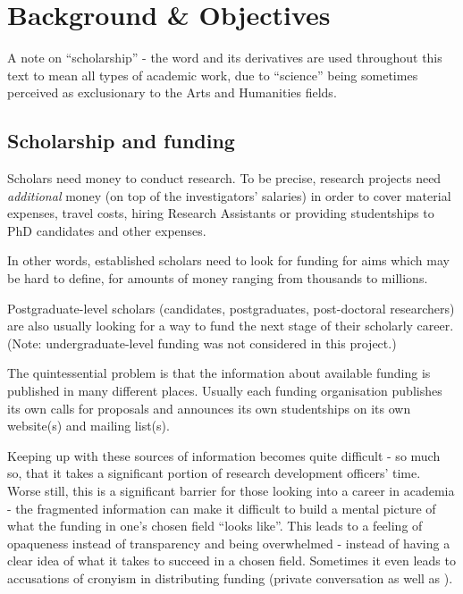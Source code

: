 \chapter{Background \& Objectives}



A note on ``scholarship'' - the word and its derivatives are used throughout this text to mean all types of academic work, due to ``science'' being sometimes perceived as exclusionary to the Arts and Humanities fields.

\section{Scholarship and funding}
Scholars need money to conduct research. To be precise, research projects need \emph{additional} money (on top of the investigators' salaries) in order to cover material expenses, travel costs, hiring Research Assistants or providing studentships to PhD candidates and other expenses. 

In other words, established scholars need to look for funding for aims which may be hard to define, for amounts of money ranging from thousands to millions.

Postgraduate-level scholars (candidates, postgraduates, post-doctoral researchers) are also usually looking for a way to fund the next stage of their scholarly career. (Note: undergraduate-level funding was not considered in this project.)

The quintessential problem is that the information about available funding is published in many different places. Usually each funding organisation publishes its own calls for proposals and announces its own studentships on its own website(s) and mailing list(s).

Keeping up with these sources of information becomes quite difficult - so much so, that it takes a significant portion of research development officers' time. Worse still, this is a significant barrier for those looking into a career in academia - the fragmented information can make it difficult to build a mental picture of what the funding in one's chosen field ``looks like''. This leads to a feeling of opaqueness instead of transparency and being overwhelmed - instead of having a clear idea of what it takes to succeed in a chosen field. Sometimes it even leads to accusations of cronyism in distributing funding (private conversation as well as \cite{cronyism1, cronyism2}).


